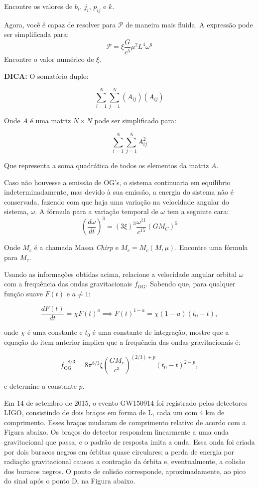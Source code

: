 \documentclass[11pt]{article}
\begin{document}
\begin{pproblem}
\begin{alternativas}
    Encontre os valores de \(b_i\), \(j_i\), \(p_{ij}\) e \(k\).

    \item Agora, você é capaz de resolver para \(\mathcal{P}\) de maneira mais fluida. A expressão pode ser simplificada para:
    \[\mathcal{P} = \xi \frac{G}{c^5}\mu^2L^4\omega^6\]
    Encontre o valor numérico de \(\xi\).

    \textbf{DICA: } O somatório duplo:

    \[\sum_{i=1}^N\sum_{j=1}^N (A_{ij})(A_{ij})\]

    Onde \(A\) é uma matriz \(N\times N\) pode ser simplificado para:

    \[\sum_{i=1}^N\sum_{j=1}^N A_{ij}^2\]

    Que representa a soma quadrática de todos os elementos da matriz \(A\).

    \item Caso não houvesse a emissão de OG's, o sistema continuaria em equilíbrio indeterminadamente, mas devido à sua emissão, a energia do sistema não é conservada, fazendo com que haja uma variação na velocidade angular do sistema, \(\omega\). A fórmula para a variação temporal de \(\omega\) tem a seguinte cara:
    \[\left(\frac{d\omega}{dt}\right)^3 = (3\xi )^3 \frac{\omega^{11}}{c^{15}}(GM_C)^5\]
    
    Onde \(M_c\) é a chamada Massa \textit{Chirp} e \(M_c = M_c(M, \mu)\). Encontre uma fórmula para \(M_c\).

    \item Usando as informações obtidas acima, relacione a velocidade angular orbital \(\omega \) com a frequência das ondas gravitacionais \( f_{\text{OG}} \). Sabendo que, para qualquer função suave \( F(t) \) e \( a \neq 1 \):

    \[
    \frac{dF(t)}{dt} = \chi F(t)^a \implies F(t)^{1-a} = \chi (1-a)(t_0 - t),
    \]
    
    onde \( \chi \) é uma constante e \( t_0 \) é uma constante de integração, mostre que a equação do item anterior implica que a frequência das ondas gravitacionais é:
    
    \[
    f_{\text{OG}}^{-8/3} = 8\pi^{8/3} \xi \left( \frac{GM_c}{c^3} \right)^{(2/3)+p} (t_0 - t)^{2-p},
    \]
    
    e determine a constante \( p \).

    Em 14 de setembro de 2015, o evento GW150914 foi registrado pelos detectores LIGO, consistindo de dois braços em forma de L, cada um com 4 km de comprimento. Esses braços mudaram de comprimento relativo de acordo com a Figura abaixo. Os braços do detector respondem linearmente a uma onda gravitacional que passa, e o padrão de resposta imita a onda. Essa onda foi criada por dois buracos negros em órbitas quase circulares; a perda de energia por radiação gravitacional causou a contração da órbita e, eventualmente, a colisão dos buracos negros. O ponto de colisão corresponde, aproximadamente, ao pico do sinal após o ponto D, na Figura abaixo.


\end{alternativas}
\end{pproblem}
\end{document}
